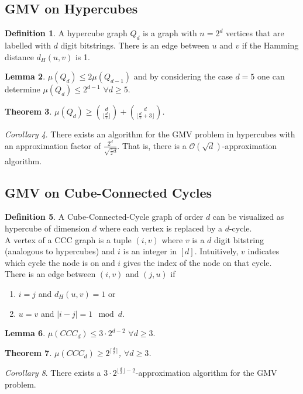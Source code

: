 \documentclass[a4paper, 12pt]{article}
\theoremstyle{plain}
\newtheorem{theorem}{Theorem}[section] %
\theoremstyle{definition}
\newtheorem{definition}[theorem]{Definition} %
\theoremstyle{lemma}
\newtheorem{lemma}[theorem]{Lemma}
\theoremstyle{remark}
\theoremstyle{corollary}
\newtheorem{corollary}[theorem]{Corollary}
\theoremstyle{example}
\begin{document}
	\subsection{GMV on Hypercubes}
	\begin{definition}
		A hypercube graph $Q_d$ is a graph with $n=2^d$ vertices that are labelled with $d$ digit bitstrings. There is an edge between $u$ and $v$ if the Hamming distance $d_H(u,v)$ is 1.
	\end{definition}
	\begin{lemma}
		$\mu(Q_d) \leq 2 \mu(Q_{d-1})$ and by considering the case $d=5$ one can determine $\mu(Q_d) \leq 2^{d-1}$ $\forall d \geq 5$.
	\end{lemma}
	\begin{theorem}
		$\mu(Q_d) \geq \binom{d}{\lfloor\frac{d}{2}\rfloor} + \binom{d}{\lfloor\frac{d}{2}+3\rfloor}$.
	\end{theorem}
	\begin{corollary}
		There exists an algorithm for the GMV problem in hypercubes with an approximation factor of $\frac{2^d}{\sqrt{\frac{\pi}{2}d}}$. That is, there is a $\mathcal{O}(\sqrt{d})$-approximation algorithm.
	\end{corollary}
	\subsection{GMV on Cube-Connected Cycles}
	\begin{definition}
		A Cube-Connected-Cycle graph of order $d$ can be visualized as hypercube of dimension $d$ where each vertex is replaced by a $d$-cycle.\\
		A vertex of a CCC graph is a tuple $(i,v)$ where $v$ is a $d$ digit bitstring (analogous to hypercubes) and $i$ is an integer in $[d]$. Intuitively, $v$ indicates which cycle the node is on and $i$ gives the index of the node on that cycle.\\
		There is an edge between $(i,v)$ and $(j,u)$ if
		\begin{enumerate}
			\item $i=j$ and $d_H(u,v) = 1$ or 
			\item $u=v$ and $|i-j| = 1 \mod d$.
		\end{enumerate} 
	\end{definition}
	\begin{lemma}
		$\mu(CCC_d) \leq 3 \cdot 2^{d-2}$ $\forall d \geq 3$.
	\end{lemma}
	\begin{theorem}
		$\mu(CCC_d) \geq 2^{\lceil\frac{d}{2}\rceil}$, $\forall d \geq 3$.
	\end{theorem}
	\begin{corollary}
		There exists a $3\cdot 2^{\lfloor\frac{d}{2}\rfloor-2}$-approximation algorithm for the GMV problem.
	\end{corollary}
\end{document}
